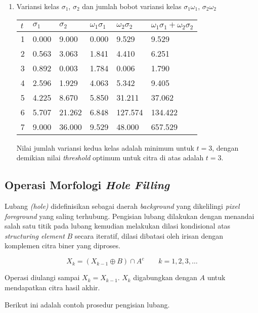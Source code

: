 \documentclass[laporan.tex]{subfiles}
\begin{document}
\begin{enumerate}
\item Variansi kelas $\sigma_1$, $\sigma_2$ dan jumlah bobot variansi kelas $\sigma_1 \omega_1$, $\sigma_2 \omega_2$ \\
\begin{tabular}{|l|l|l|l|l|l|}
\hline
$t$ & $\sigma_1$ & $\sigma_2$ & $\omega_1 \sigma_1$ & $\omega_2 \sigma_2$ & $\omega_1 \sigma_1 + \omega_2 \sigma_2$ \\
\hline
1 & 0.000 & 9.000 & 0.000 & 9.529 & 9.529 \\
2 & 0.563 & 3.063 & 1.841 & 4.410 & 6.251 \\
3 & 0.892 & 0.003 & 1.784 & 0.006 & 1.790 \\
4 & 2.596 & 1.929 & 4.063 & 5.342 & 9.405 \\
5 & 4.225 & 8.670 & 5.850 & 31.211 & 37.062 \\
6 & 5.707 & 21.262 & 6.848 & 127.574 & 134.422 \\
7 & 9.000 & 36.000 & 9.529 & 48.000 & 657.529 \\
\hline
\end{tabular}

Nilai jumlah variansi kedua kelas adalah minimum untuk $t=3$, dengan demikian nilai \emph{threshold} optimum untuk citra di atas adalah $t=3$.

\end{enumerate}

\subsection{Operasi Morfologi \emph{Hole Filling}}

Lubang \emph{(hole)} didefinisikan sebagai daerah \emph{background} yang dikelilingi \emph{pixel} \emph{foreground} yang saling terhubung. Pengisian lubang dilakukan dengan menandai salah satu titik pada lubang kemudian melakukan dilasi kondisional atas \emph{structuring element} $B$ secara iteratif, dilasi dibatasi oleh irisan dengan komplemen citra biner yang diproses.

\begin{equation}
X_k = (X_{k-1} \oplus B) \cap A^c \qquad k=1,2,3,\ldots
\label{eq:fill}
\end{equation}

Operasi diulangi sampai $X_k = X_{k-1}$. $X_k$ digabungkan dengan $A$ untuk mendapatkan citra hasil akhir.

Berikut ini adalah contoh prosedur pengisian lubang.
\end{document}
